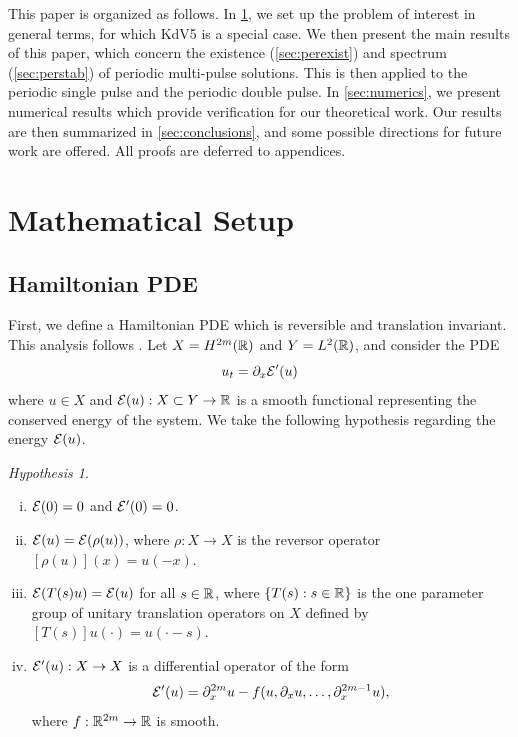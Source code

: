 \documentclass[10pt,reqno]{amsart}
\theoremstyle{plain}
\theoremstyle{definition}
\theoremstyle{remark}
\newtheorem{hypothesis}[theorem]{Hypothesis}
\numberwithin{theorem}{section}
\numberwithin{equation}{section}
\begin{document}
This paper is organized as follows. In \cref{sec:setup}, we set up the problem of interest in general terms, for which KdV5 is a special case. We then present the main results of this paper, which concern the existence (\cref{sec:perexist}) and spectrum (\cref{sec:perstab}) of periodic multi-pulse solutions. This is then applied to the periodic single pulse and the periodic double pulse. In \cref{sec:numerics}, we present numerical results which provide verification for our theoretical work. Our results are then summarized in \cref{sec:conclusions}, and some possible directions for future work are offered. All proofs are deferred to appendices.

\section{Mathematical Setup}\label{sec:setup}

\subsection{Hamiltonian PDE}\label{sec:HamPDE}

First, we define a Hamiltonian PDE which is reversible and translation invariant. This analysis follows \cite{Grillakis1987}. Let $X = H^{2m}(\mathbb{R})$ and $Y = L^2(\mathbb{R})$, and consider the PDE
\begin{equation}\label{genPDE}
u_t = \partial_x \mathcal{E}'(u)
\end{equation}
where $u \in X$ and $\mathcal{E}(u): X \subset Y \rightarrow \mathbb{R}$ is a smooth functional representing the conserved energy of the system. We take the following hypothesis regarding the energy $\mathcal{E}(u)$.

\begin{hypothesis}\label{hyp:E}
\begin{enumerate}[(i)]
\item $\mathcal{E}(0) = 0$ and $\mathcal{E}'(0) = 0$.
\item $\mathcal{E}(u) = \mathcal{E}(\rho(u))$, where $\rho: X \rightarrow X$ is the reversor operator $[\rho(u)](x) = u(-x)$.
\item $\mathcal{E}(T(s)u) = \mathcal{E}(u)$ for all $s \in \mathbb{R}$, where $\{T(s) : s \in \mathbb{R} \}$ is the one parameter group of unitary translation operators on $X$ defined by $[T(s)]u(\cdot) = u(\cdot - s)$.
\item $\mathcal{E}'(u): X \rightarrow X$ is a differential operator of the form
\begin{equation}\label{Eprimeuform}
\mathcal{E}'(u) = \partial_x^{2m}u - f(u, \partial_x u, \dots, \partial_x^{2m-1} u),
\end{equation}
where $f: \mathbb{R}^{2m} \rightarrow \mathbb{R}$ is smooth.
\end{enumerate}
\end{hypothesis}
\end{document}
